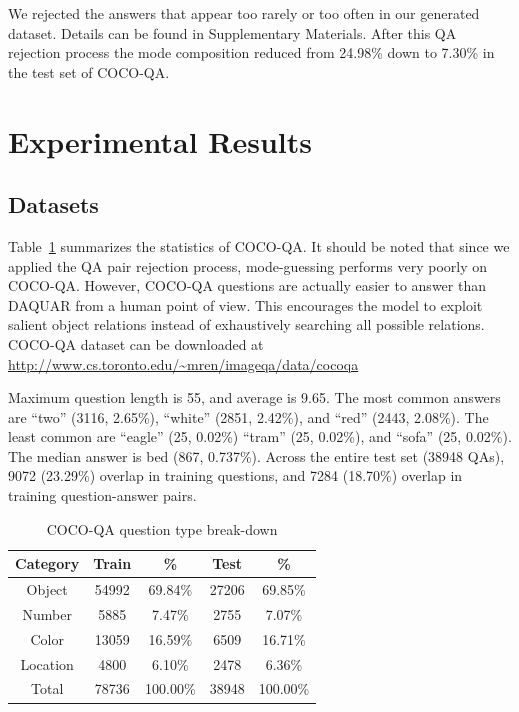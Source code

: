 \documentclass{article} %
\renewcommand{\#}[1]{\textbf{#1}}
\begin{document}
We rejected the answers that appear too rarely or too often in our generated
dataset. Details can be found in Supplementary Materials. After this QA
rejection process the mode composition reduced from 24.98\% down to 7.30\% in
the test set of COCO-QA.

\section{Experimental Results}

\subsection{Datasets}

Table~\ref{tab:dataset_category_stats} summarizes the statistics of COCO-QA. It
should be noted that since we applied the QA pair rejection process,
mode-guessing performs very poorly on COCO-QA. However, COCO-QA questions are
actually easier to answer than DAQUAR from a human point of view. This
encourages the model to exploit salient object relations instead of
exhaustively searching all possible relations. COCO-QA dataset can be
downloaded at \url{http://www.cs.toronto.edu/~mren/imageqa/data/cocoqa}

Maximum question length is 55, and average is 9.65.  The most common answers
are ``two'' (3116, 2.65\%), ``white'' (2851, 2.42\%), and ``red'' (2443,
2.08\%). The least common are ``eagle'' (25, 0.02\%) ``tram'' (25, 0.02\%), and
``sofa'' (25, 0.02\%).  The median answer is bed (867, 0.737\%).  Across the
entire test set (38948 QAs), 9072 (23.29\%) overlap in training questions, and
7284 (18.70\%) overlap in training question-answer pairs.

\begin{table}
\caption{COCO-QA question type break-down}
\label{tab:dataset_category_stats}
\vskip 0.15in
\begin{center}
\begin{small}
\begin{sc}
\begin{tabular}{c c c c c}
\hline
Category & Train & \%       & Test  & \%       \\
\hline
Object   & 54992 & 69.84\%  & 27206 & 69.85\%  \\
Number   & 5885  & 7.47\%   & 2755  & 7.07\%   \\
Color    & 13059 & 16.59\%  & 6509  & 16.71\%  \\
Location & 4800  & 6.10\%   & 2478  & 6.36\%   \\
\hline
Total    & 78736 & 100.00\% & 38948 & 100.00\% \\
\hline
\end{tabular}
\end{sc}
\end{small}
\end{center}
\end{table}
\end{document}
